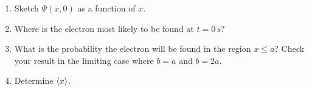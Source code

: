 \documentclass[a4paper, 12pt]{config/homework}
\begin{document}
\begin{enumerate}
\begin{enumerate}[label=(\alph*)]
\item Sketch \(\Psi(x,0)\) as a function of \(x\).

\item Where is the electron most likely to be found at \(t=\qty{0}{\second}\)?

\item What is the probability the electron will be found in the region \(x \le a\)? Check your result in the limiting case where \(b=a\) and \(b=2a\).

\item Determine \(\braket{x}\).

\end{enumerate}
\end{enumerate}
\end{document}
